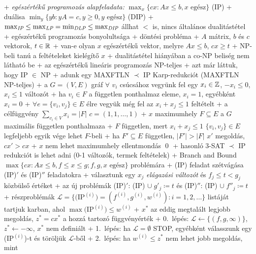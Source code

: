 + \dfn \emph{egészértékű programozás alapfeladata:} $\max_{x} \{ cx : Ax \le b, x
  \text{ egész} \}$ (IP)
  + duálisa $\min_{y} \{ yb : yA = c, y \ge 0, y \text{ egész} \}$ (DIP)
  + $\max_{\textit{IP}} \le \max_{\textit{LP}} = \min_{\textit{DLP}} \le \max_{\textit{DIP}}$ \RA állhat
    $<$ is, nincs általános dualitástétel
+ egészértékű programozás bonyolultsága
  + döntési probléma
    + \DataIn $A$ mátrix, $b$ és $c$ vektorok, $t \in \mathbb{R}$
    + \DataOut van-e olyan $x$ egészértékű vektor, melyre $Ax \le b$, $cx \ge t$
  + NP-beli \ra tanú a feltételeket kielégítő $x$
  + dualitástétel hiányában a co-NP beliség nem látható be
  + \thm az egészértékű lineáris programozás NP-teljes
    + \proof azt már láttuk, hogy IP $\in$ NP
    + adunk egy MAXFTLN $\prec$ IP Karp-redukciót (MAXFTLN NP-teljes)
    + a $G = (V, E)$ gráf $\forall$ $v_i$ csúcsához vegyünk fel egy
      $x_i \in \mathbb{Z}$, $-x_i \le 0$, $x_i \le 1$ változót
      + ha $v_i \in F$ a független ponthalmaz eleme, $x_i = 1$,
        egyébként $x_i = 0$
    + $\forall e = \{ v_i, v_j \} \in E$ élre vegyük még fel az $x_i +
      x_j \le 1$ feltételt
    + a célfüggvény $\sum_{v_i \in V} x_i = \lvert F \rvert$ \RA $c =
      (1, 1, \ldots, 1)$
    + $x$ maximumhely \LRA $F \subseteq E$ a $G$ maximális független
      ponthalmaza
      + $F$ független, mert $x_i + x_j \le 1$ \RA $\{ v_i,
        v_j \} \in E$ legfeljebb egyik vége lehet $F$-beli
      + ha $F' \subseteq E$ független, $\lvert F' \rvert > \lvert F
        \rvert$ \RA $x'$ megoldás, $cx' > cx$
      + $x$ nem lehet maximumhely \RA ellentmondás \qed
    + hasonló 3-SAT $\prec$ IP redukciót is lehet adni (0-1
      változók, termek \ra feltételek)
+ \alg Branch and Bound $\max \{ cx : Ax \le b, f \le x \le g; f, g, x
  \text{ egész} \}$ problémára
  + (IP) feladat szétvágása (IP)$'$ és (IP)$''$ feladatokra
    + választunk egy $x_j$ \emph{elágazási változót} és $f_j \le t <
      g_j$ közbülső értéket
    + az új problémák (IP)$'$: (IP) $\cup\;g'_j \coloneqq t$ és
      (IP)$''$: (IP) $\cup\;f''_j \coloneqq t$
  + részproblémák $\mathcal{L} = \{ \text{(IP$^{(i)}$)} = (f^{(i)},
    g^{(i)}, w^{(i)}) : i = 1, 2, \ldots\}$ listáját tartjuk karban,
    ahol $\max \text{(IP$^{(i)}$)} \le w^{(i)}$
  + $x^*$ az eddig megtalált legjobb megoldás, $z^* = c x^*$ a hozzá
    tartozó függvényérték
  + 0.~lépés: $\mathcal{L} \gets \{ (f, g, \infty) \}$, $z^* \gets
    -\infty$, $x^*$ nem definiált
  + 1.~lépés: ha $\mathcal{L} = \emptyset$ \RA STOP, egyébként
    válasszunk egy (IP$^{(i)}$)-t és töröljük $\mathcal{L}$-ből
  + 2.~lépés: ha $w^{(i)} \le z^*$ \RA nem lehet jobb megoldás, mint
